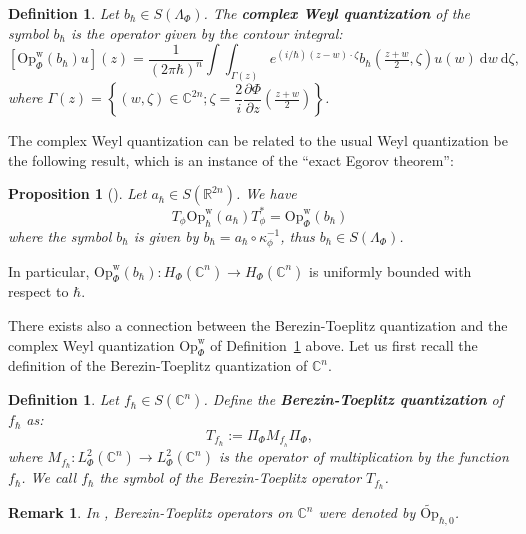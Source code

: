 \documentclass{article}
\newtheorem{prop}[theo]{Proposition}
\newtheorem{defi}[theo]{Definition}
\newtheorem{remark}[theo]{Remark}
\newcommand{\Op}{\mathrm{Op}}
\newcommand{\w}{\mathrm{w}}
\newcommand{\DD}{\:\!\mathrm{d}}
\newcommand{\intint}{\int\!\!\!\!\int}
\newcommand{\CM}{\mathbb{C}}
\newcommand{\h}{\hbar}
\begin{document}
\begin{defi}
  \label{defi:complex-weyl}
  Let $b_{ \hbar} \in S( \Lambda_{ \Phi})$.  The \textbf{complex Weyl
    quantization} of the symbol $b_{ \hbar}$ is the operator given by
  the contour integral:
  \[
  [\Op^{\w}_{ \Phi}(b_{ \hbar}) u] (z) = \dfrac{1}{(2 \pi \hbar)^n}
  \intint_{\Gamma(z)} e^{(i/\hbar) (z-w) \cdot \zeta} b_{ \hbar}
  \left( \tfrac{z+w}{2}, \zeta \right) u(w)\DD w\DD \zeta,
  \]
  where
  $ \Gamma(z) = \left\lbrace (w, \zeta) \in \CM^{2n}; \zeta =
    \dfrac{2}{i} \dfrac{\partial \Phi}{\partial z} \left(
      \tfrac{z+w}{2} \right) \right\rbrace$.
\end{defi}

The complex Weyl quantization can be related to the usual Weyl
quantization be the following result, which is an instance of the
``exact Egorov theorem'':
\begin{prop}[\cite{h-sj-04}]\label{prop_transfor_Bargmann_et_quantif_weyl}
  Let $a_{ \hbar} \in S( \mathbb{R}^{2n})$. We have
  \begin{equation}
    T_{ \phi} \Op^{\w}_\h(a_{ \hbar}) T_\phi^*  = \Op^{\w}_{ \Phi}(b_{ \hbar})
  \end{equation}
  where the symbol $b_{ \hbar}$ is given by
  $ b_{ \hbar} = a_{ \hbar} \circ \kappa_{ \phi}^{-1}$, thus
  $b_{ \hbar} \in S( \Lambda_{ \Phi})$.
\end{prop}
In particular,
$ \Op^{\w}_{ \Phi}(b_{ \hbar}) : H_{ \Phi}( \CM^n) \to H_{ \Phi}(
\CM^n)$ is uniformly bounded with respect to $\hbar$.

There exists also a connection between the Berezin-Toeplitz
quantization and the complex Weyl quantization $\Op^{\w}_{ \Phi}$ of
Definition~\ref{defi:complex-weyl} above. Let us first recall the
definition of the Berezin-Toeplitz quantization of $ \CM^n$.

\begin{defi}
  Let $f_{\hbar} \in S( \CM^n)$. Define the \textbf{Berezin-Toeplitz
    quantization} of $f_{\hbar}$ as:
  \[
  T_{f_{\hbar}} := \Pi_{ \Phi} M_{f_{_\hbar}} \Pi_{ \Phi} ,
  \]
  where $M_{f_{\hbar}}: L^2_{\Phi}( \CM^n) \to L^2_{\Phi}( \CM^n)$ is
  the operator of multiplication by the function $f_{\hbar}$. We call
  $f_{\hbar}$ the {symbol} of the {Berezin-Toeplitz operator}
  $T_{f_{\hbar}}$.
\end{defi}

\begin{remark}
  In \cite{sj-96}, Berezin-Toeplitz operators on $ \CM^n$ were denoted
  by $ \widetilde{\Op}_{ \hbar, 0}$.
\end{remark}
\end{document}
